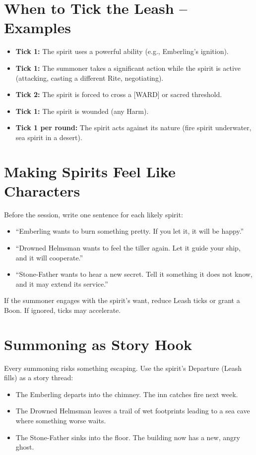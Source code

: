 \documentclass[10pt,a5paper]{book}
\begin{document}
\section{When to Tick the Leash – Examples}
\begin{itemize}
    \item \textbf{Tick 1:} The spirit uses a powerful ability (e.g., Emberling’s ignition).
    \item \textbf{Tick 1:} The summoner takes a significant action while the spirit is active (attacking, casting a different Rite, negotiating).
    \item \textbf{Tick 2:} The spirit is forced to cross a [WARD] or sacred threshold.
    \item \textbf{Tick 1:} The spirit is wounded (any Harm).
    \item \textbf{Tick 1 per round:} The spirit acts against its nature (fire spirit underwater, sea spirit in a desert).
\end{itemize}

\section{Making Spirits Feel Like Characters}
Before the session, write one sentence for each likely spirit:
\begin{itemize}
    \item “Emberling wants to burn something pretty. If you let it, it will be happy.”
    \item “Drowned Helmsman wants to feel the tiller again. Let it guide your ship, and it will cooperate.”
    \item “Stone-Father wants to hear a new secret. Tell it something it does not know, and it may extend its service.”
\end{itemize}
If the summoner engages with the spirit’s want, reduce Leash ticks or grant a Boon. If ignored, ticks may accelerate.

\section{Summoning as Story Hook}
Every summoning risks something escaping. Use the spirit’s Departure (Leash fills) as a story thread:
\begin{itemize}
    \item The Emberling departs into the chimney. The inn catches fire next week.
    \item The Drowned Helmsman leaves a trail of wet footprints leading to a sea cave where something worse waits.
    \item The Stone-Father sinks into the floor. The building now has a new, angry ghost.
\end{itemize}
\end{document}

